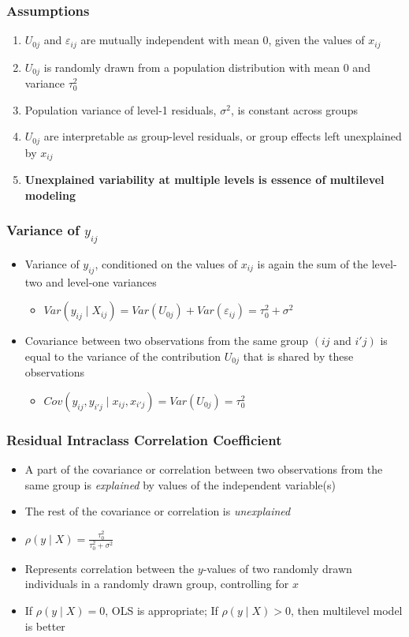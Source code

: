 \documentclass{beamer}
\begin{document}
\begin{frame}
	\frametitle{Assumptions}
		\begin{enumerate}
			\item $U_{0j}$ and $\varepsilon_{ij}$ are mutually independent with mean $0$, given the values of $x_{ij}$
			\item $U_{0j}$ is randomly drawn from a population distribution with mean $0$ and variance $\tau^{2}_{0}$
			\item Population variance of level-1 residuals, $\sigma^2$, is constant across groups
			\item $U_{0j}$ are interpretable as group-level residuals, or group effects left unexplained by $x_{ij}$
			\item \textbf{Unexplained variability at multiple levels is essence of multilevel modeling}
		\end{enumerate}
\end{frame}

\begin{frame}
	\frametitle{Variance of $y_{ij}$}
		\begin{itemize}
			\item Variance of $y_{ij}$, conditioned on the values of $x_{ij}$ is again the sum of the level-two and level-one variances
				\begin{itemize}
					\item $Var(y_{ij}\mid X_{ij})=Var(U_{0j})+Var(\varepsilon_{ij})=\tau^{2}_{0}+\sigma^2$
				\end{itemize}
			\item Covariance between two observations from the same group $(ij\mbox{ and }i'j)$ is equal to the variance of the contribution $U_{0j}$ that is shared by these observations
				\begin{itemize}
					\item $Cov(y_{ij},y_{i'j}\mid x_{ij},x_{i'j})=Var(U_{0j})=\tau^{2}_{0}$
				\end{itemize}
		\end{itemize}
\end{frame}

\begin{frame}
	\frametitle{Residual Intraclass Correlation Coefficient}
		\begin{itemize}
			\item A part of the covariance or correlation between two observations from the same group is \textit{explained} by values of the independent variable(s)
			\item The rest of the covariance or correlation is \textit{unexplained}
			\item $\rho(y\mid X)=\frac{\tau^{2}_{0}}{\tau^{2}_{0}+\sigma^2}$
			\item Represents correlation between the $y$-values of two randomly drawn individuals in a randomly drawn group, controlling for $x$
			\item If $\rho(y\mid X)=0$, OLS is appropriate; If $\rho(y\mid X)>0$, then multilevel model is better
		\end{itemize}
\end{frame}
\end{document}
